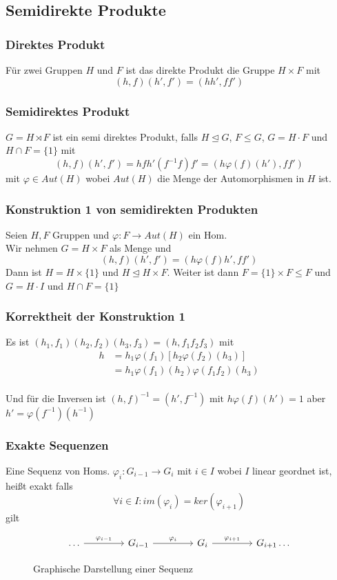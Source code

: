 \documentclass[12pt, german]{article}
\begin{document}
\subsection{Semidirekte Produkte}
\subsubsection{Direktes Produkt}
	Für zwei Gruppen $H$ und $F$ ist das direkte Produkt die Gruppe $H \times F$ mit  $$(h,f)(h', f') = (hh', ff')$$

\subsubsection{Semidirektes Produkt}
	$G = H \rtimes F$ ist ein semi direktes Produkt, falls $H \trianglelefteq G$, $F \leq G$,  $G = H\cdot F$ und $H \cap F = \{1\}$ mit 
	$$(h,f)(h',f') = hfh'(f^{-1}f)f' = (h\varphi(f)(h'), ff')$$
	mit $\varphi \in Aut(H)$ wobei $Aut(H)$ die Menge der Automorphismen in $H$ ist.

\subsubsection{Konstruktion 1 von semidirekten Produkten}
	Seien $H, F$ Gruppen und $\varphi: F\to Aut(H)$ ein Hom. \\ 
	Wir nehmen $G = H \times F$ als Menge und $$ (h,f)(h',f') = (h\varphi(f)h', ff')$$
	Dann ist $H= H \times \{1\}$ und $H \trianglelefteq H \times F$. 
	Weiter ist dann $F = \{1\} \times F \leq F$ und $G= H\cdot I$ und $H\cap F = \{1\}$

\subsubsection{Korrektheit der Konstruktion 1}
	Es ist $(h_1, f_1)(h_2, f_2)(h_3, f_3) = (h, f_1f_2f_3)$ mit 
	\begin{align*}
		h&=h_1\varphi(f_1)[h_2\varphi(f_2)(h_3)] \\
		&=h_1\varphi(f_1)(h_2)\varphi(f_1f_2)(h_3)
	\end{align*} 
	\\ 
	Und für die Inversen ist $(h, f)^{-1} = (h', f^{-1}) \text{ mit } h\varphi(f)(h')= 1$ aber $h' = \varphi(f^{-1})(h^{-1})$

\subsubsection{Exakte Sequenzen}
Eine Sequenz von Homs. $\varphi_i: G_{i-1} \to G_i$ mit $i \in I$ wobei $I$ linear geordnet ist, heißt exakt falls $$\forall i \in I : im(\varphi_i) = ker(\varphi_{i+1})$$ gilt
	\begin{figure}[h!]
		\centering
	\begin{equation*}
		\begin{tikzcd}[column sep=3.5pc]
				\ldots \arrow{r}{\varphi_{i-1}} & G_{i -1} \arrow{r}{\varphi_{i}} & G_{i} \arrow{r}{\varphi_{i+1}} & G_{i+1} \ldots 
		\end{tikzcd}
	\end{equation*}
		\caption{Graphische Darstellung einer Sequenz}
\end{figure}
\end{document}
